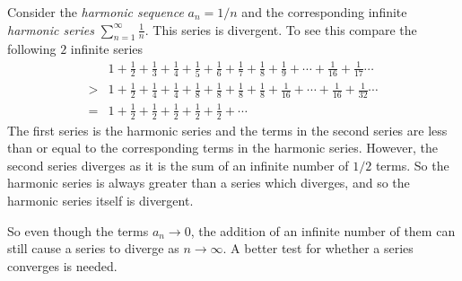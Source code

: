 Consider the \emph{harmonic sequence} $a_n=1/n$ and the corresponding infinite \emph{harmonic series} $\displaystyle \sum_{n=1}^{\infty} \frac{1}{n}$. This series is divergent. To see this compare the following $2$ infinite series
\begin{align*}
  &1+\frac{1}{2}+\frac{1}{3}+\frac{1}{4}+\frac{1}{5}+\frac{1}{6}+\frac{1}{7}+\frac{1}{8}+\frac{1}{9}+\cdots+\frac{1}{16}+\frac{1}{17}\cdots\\
  >&1+\frac{1}{2}+\frac{1}{4}+\frac{1}{4}+\frac{1}{8}+\frac{1}{8}+\frac{1}{8}+\frac{1}{8}+\frac{1}{16}+\cdots+\frac{1}{16}+\frac{1}{32}\cdots\\
  = & 1+\frac{1}{2}+\frac{1}{2}+\frac{1}{2}+\frac{1}{2}+\frac{1}{2}+\cdots
\end{align*}
The first series is the harmonic series and the terms in the second series are less than or equal to the corresponding terms in the harmonic series. However, the second series diverges as it is the sum of an infinite number of $1/2$ terms. So the harmonic series is always greater than a series which diverges, and so the harmonic series itself is divergent.

So even though the terms $a_n \to 0$, the addition of an infinite number of them can still cause a series to diverge as $n \to \infty $. A better test for whether a series converges is needed.
